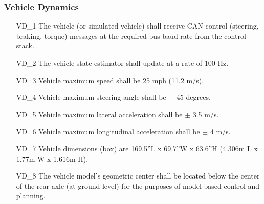 \subsubsection{Vehicle Dynamics}
\begin{itemize}
        \item[VD\_1] The vehicle (or simulated vehicle) shall receive CAN control (steering, braking, torque) messages at the required bus baud rate from the control stack.
        \item[VD\_2] The vehicle state estimator shall update at a rate of 100 Hz.
        \item[VD\_3] Vehicle maximum speed shall be 25 mph (11.2 m/s).
        \item[VD\_4] Vehicle maximum steering angle shall be $\pm$ 45 degrees.
        \item[VD\_5] Vehicle maximum lateral acceleration shall be $\pm$ 3.5 m/s.
        \item[VD\_6] Vehicle maximum longitudinal acceleration shall be $\pm$ 4 m/s.
        \item[VD\_7] Vehicle dimensions (box) are 169.5”L x 69.7”W x 63.6”H (4.306m L x 1.77m W x 1.616m H).
        \item[VD\_8] The vehicle model's geometric center shall be located below the center of the rear axle (at ground level) for the purposes of model-based control and planning.
    \end{itemize}